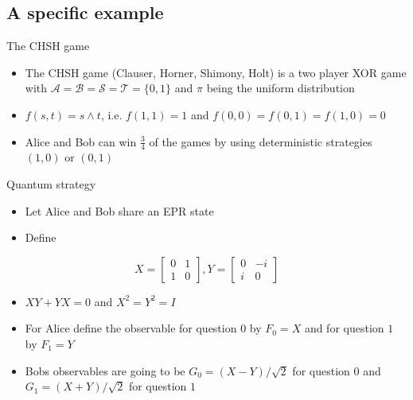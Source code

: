 \subsection{A specific example}
\begin{frame}{The CHSH game}
\begin{itemize}
    \item The CHSH game (Clauser, Horner, Shimony, Holt) is a two player XOR game with $\mathcal{A} = \mathcal{B} = \mathcal{S} = \mathcal{T} = \{0,1\}$ and $\pi$ being the uniform distribution
    \item  $f(s,t)= s \land t$, i.e. $f(1,1)=1$ and $f(0,0)=f(0,1)=f(1,0)=0$
    \item Alice and Bob can win $\frac{3}{4}$ of the games by using deterministic strategies $(1,0) \text{ or } (0,1)$
\end{itemize}
\begin{block}{Quantum strategy}
\begin{itemize}
    \item Let Alice and Bob share an EPR state
    \item Define 
\end{itemize}
    \begin{equation*}
X = \begin{bmatrix}
0 & 1 \\
1 & 0
\end{bmatrix} , Y = \begin{bmatrix}
0 & -i \\ 
i & 0 
\end{bmatrix}
\end{equation*}
\begin{itemize}
    \item $XY +YX = 0$ and $X^2=Y^2=I$
    \item For Alice define the observable for question $0$ by $F_0=X$ and for question $1$ by $F_1=Y$
    \item Bobs observables are going to be $G_0 = (X-Y)/ \sqrt{2}$ for question $0$ and $G_1 = (X+Y)/\sqrt{2}$ for question $1$
\end{itemize}
\end{block}
\end{frame}

